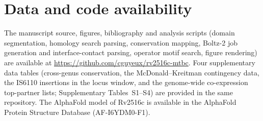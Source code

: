 \documentclass[11pt,a4paper]{article}
\begin{document}
\section*{Data and code availability}

The manuscript source, figures, bibliography and analysis scripts (domain segmentation, homology
search parsing, conservation mapping, Boltz-2 job generation and interface-contact parsing,
operator motif search, figure rendering) are available at
\url{https://github.com/cguyeux/rv2516c-mtbc}. Four supplementary data tables (cross-genus
conservation, the McDonald--Kreitman contingency data, the IS6110 insertions in the locus window,
and the genome-wide co-expression top-partner lists; Supplementary Tables~S1--S4) are provided in
the same repository. The AlphaFold model of Rv2516c is available in the AlphaFold
Protein Structure Database (AF-I6YDM0-F1).



\end{document}
